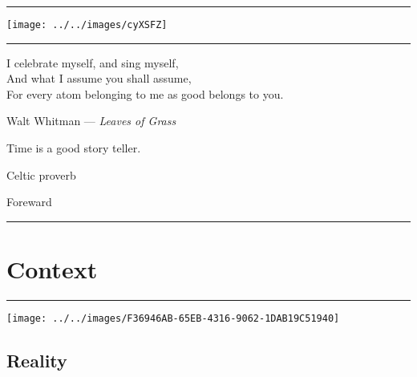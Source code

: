 \documentclass[letterpaper,11pt,twoside,onecolumn,openany]{book}
\begin{document}
	\tableofcontents
	
	\newpage
	\thispagestyle{empty}
	\hrule
	
	\vspace{30mm}
	
	\begin{center}
		\texttt{[image: ../../images/cyXSFZ]}
	\end{center}
	
	
	\newpage
	\thispagestyle{empty}
	\hrule
	
	\vspace{40mm}
	
	\begin{center}
		I celebrate myself, and sing myself,\\
		And what I assume you shall assume,\\
		For every atom belonging to me as good belongs to you.\\
		\vspace{5mm}
		
		Walt Whitman --- \textit{Leaves of Grass}
		
		
	\end{center}
	
	\vspace{5mm}
	\begin{center}
		
		Time is a good story teller.
		
		
		Celtic proverb
		
	\end{center}
	
	\newpage
	\thispagestyle{empty}
	
	\begin{center}
		\huge{Foreward}
	\end{center}
	\hrule
	
	
	
	\part{Context}
	
	\thispagestyle{empty}
	\hrule
	\vspace{40mm}
	
\begin{center}
	\texttt{[image: ../../images/F36946AB-65EB-4316-9062-1DAB19C51940]}
\end{center}
	
	
	\chapter{Reality}
	
\end{document}

